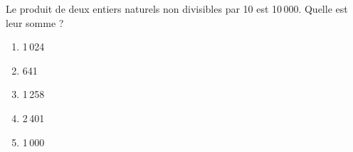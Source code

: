 Le produit de deux entiers naturels non divisibles par 10 est 10\,000. Quelle est leur somme ?
\begin{multicols}{5}
  \begin{enumerate}[A/]
  \item 1\,024
  \item 641
  \item 1\,258
  \item 2\,401
  \item 1\,000
  \end{enumerate}
\end{multicols}
